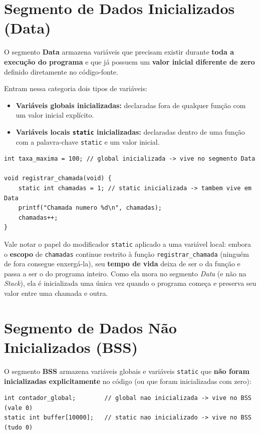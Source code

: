 \section{Segmento de Dados Inicializados (Data)}
\label{sec:segmento-data}

O segmento \textbf{Data} armazena variáveis que precisam existir durante \textbf{toda a execução do programa} e que já possuem um \textbf{valor inicial diferente de zero} definido diretamente no código-fonte.

Entram nessa categoria dois tipos de variáveis:

\begin{itemize}
    \item \textbf{Variáveis globais inicializadas:} declaradas fora de qualquer função com um valor inicial explícito.
    \item \textbf{Variáveis locais \texttt{static} inicializadas:} declaradas dentro de uma função com a palavra-chave \texttt{static} e um valor inicial.
\end{itemize}

\begin{lstlisting}
int taxa_maxima = 100; // global inicializada -> vive no segmento Data

void registrar_chamada(void) {
    static int chamadas = 1; // static inicializada -> tambem vive em Data
    printf("Chamada numero %d\n", chamadas);
    chamadas++;
}
\end{lstlisting}

Vale notar o papel do modificador \texttt{static} aplicado a uma variável local: embora o \textbf{escopo} de \texttt{chamadas} continue restrito à função \texttt{registrar\_chamada} (ninguém de fora consegue enxergá-la), seu \textbf{tempo de vida} deixa de ser o da função e passa a ser o do programa inteiro. Como ela mora no segmento \textit{Data} (e não na \textit{Stack}), ela é inicializada uma única vez quando o programa começa e preserva seu valor entre uma chamada e outra.

\section{Segmento de Dados Não Inicializados (BSS)}
\label{sec:segmento-bss}

O segmento \textbf{BSS} armazena variáveis globais e variáveis \texttt{static} que \textbf{não foram inicializadas explicitamente} no código (ou que foram inicializadas com zero):

\begin{lstlisting}
int contador_global;        // global nao inicializada -> vive no BSS (vale 0)
static int buffer[10000];   // static nao inicializado -> vive no BSS (tudo 0)
\end{lstlisting}

